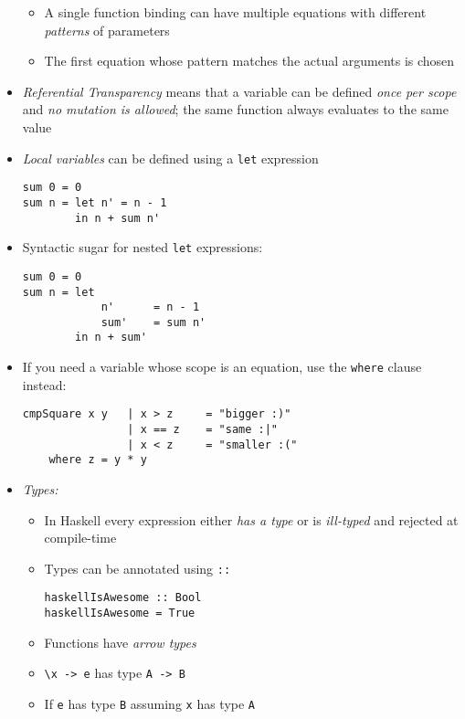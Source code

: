 \documentclass[landscape,8pt]{extarticle}
\newcommand{\code}{\lstinline}
\begin{document}
\begin{multicols}{4}
\begin{itemize}
\begin{itemize}
               \item A single function binding can have multiple equations with different \emph{patterns} of parameters
               \item The first equation whose pattern matches the actual arguments is chosen
           \end{itemize}
           \item \emph{Referential Transparency} means that a variable can be defined \emph{once per scope} and \emph{no mutation is allowed}; the same function always evaluates to the same value
           \item \emph{Local variables} can be defined using a \code{let} expression
           \begin{lstlisting}
sum 0 = 0
sum n = let n' = n - 1
        in n + sum n'
           \end{lstlisting}
           \item Syntactic sugar for nested \code{let} expressions:
           \begin{lstlisting}
sum 0 = 0
sum n = let
            n'      = n - 1
            sum'    = sum n'
        in n + sum'
           \end{lstlisting}
           \item If you need a variable whose scope is an equation, use the \code{where} clause instead:
           \begin{lstlisting}
cmpSquare x y   | x > z     = "bigger :)"
                | x == z    = "same :|"
                | x < z     = "smaller :("
    where z = y * y
           \end{lstlisting}
           \item \emph{Types:}
           \begin{itemize}
               \item In Haskell every expression either \emph{has a type} or is \emph{ill-typed} and rejected at compile-time
               \item Types can be annotated using \code{::}
               \begin{lstlisting}
haskellIsAwesome :: Bool
haskellIsAwesome = True
               \end{lstlisting}
               \item Functions have \emph{arrow types}
               \item \code{\x -> e} has type \code{A -> B}
               \item If \code{e} has type \code{B} assuming \code{x} has type \code{A}

\end{itemize}
\end{itemize}
\end{multicols}
\end{document}
